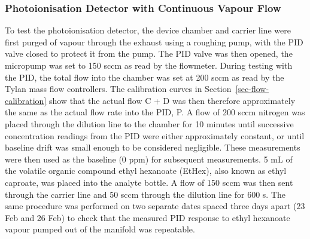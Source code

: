 \documentclass[
  a4paper,
]{scrbook}
\begin{document}
\hypertarget{photoionisation-detector-with-continuous-vapour-flow}{%
\subsubsection*{Photoionisation Detector with Continuous Vapour
Flow}\label{photoionisation-detector-with-continuous-vapour-flow}}

To test the photoionisation detector, the device chamber and carrier
line were first purged of vapour through the exhaust using a roughing
pump, with the PID valve closed to protect it from the pump. The PID
valve was then opened, the micropump was set to 150 sccm as read by the
flowmeter. During testing with the PID, the total flow into the chamber
was set at 200 sccm as read by the Tylan mass flow controllers. The
calibration curves in Section~\ref{sec-flow-calibration} show that the
actual flow C + D was then therefore approximately the same as the
actual flow rate into the PID, P. A flow of 200 sccm nitrogen was placed
through the dilution line to the chamber for 10 minutes until successive
concentration readings from the PID were either approximately constant,
or until baseline drift was small enough to be considered negligible.
These measurements were then used as the baseline (0 ppm) for subsequent
measurements. 5 mL of the volatile organic compound ethyl hexanoate
(EtHex), also known as ethyl caproate, was placed into the analyte
bottle. A flow of 150 sccm was then sent through the carrier line and 50
sccm through the dilution line for 600 s. The same procedure was
performed on two separate dates spaced three days apart (23 Feb and 26
Feb) to check that the measured PID response to ethyl hexanoate vapour
pumped out of the manifold was repeatable.
\end{document}
